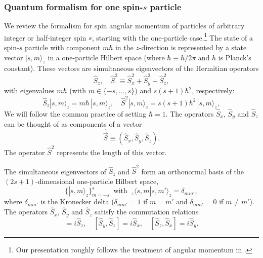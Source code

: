 

\subsubsection{Quantum formalism for one spin-$s$ particle} \label{2.1.1}

We review the formalism for spin angular momentum of particles of arbitrary integer or half-integer spin $s$, starting with the one-particle case.\footnote{Our presentation roughly follows the treatment of angular momentum in \citet[Vol.\ 2, Appendix C]{Messiah 1962}.} The state of a spin-$s$ particle with component $m\hbar$ in the $z$-direction is represented by a state vector $|s,m\rangle_z$ in a one-particle Hilbert space (where $\hbar \equiv h/2\pi$ and $h$ is Planck's constant). These vectors are simultaneous eigenvectors of the Hermitian operators 
\begin{equation}
\hat{S}_z, \quad \hat{S}^2\equiv \hat{S}_x^2+\hat{S}_y^2+\hat{S}_z^2,
\label{Sz and S^2}
\end{equation}
with eigenvalues $m \hbar$ (with $m \in \{ -s, \ldots, s\}$) and $s(s+1) \hbar^2$, respectively:
\begin{equation} 
\hat{S}_z |s,m\rangle_z =  m  \hbar \, |s,m\rangle_z,\quad \hat{S}^2 |s,m\rangle_z= s(s+1)   \hbar^2 \, |s,m\rangle_z,
\label{state dfn}
\end{equation} 
We will follow the common practice of setting $\hbar =1$. The operators $\hat{S}_x$, $\hat{S}_y$ and $\hat{S}_z$ can be thought of as components of a vector
\begin{equation}
\hat{\vec{S}} \equiv \left(\hat{S}_x, \hat{S}_y, \hat{S}_z \right).
\label{def S vector}
\end{equation}
The operator $\hat{S}^2$ represents the length of this vector. 

The simultaneous eigenvectors of $\hat{S}_z$ and $ \hat{S}^2$ form an orthonormal basis of the $(2s+1)$-dimensional one-particle Hilbert space,
\begin{equation}
\big\{|s,m \rangle_{z}\big\}_{m=-s}^s \;\; \mathrm{with} \;\; {_{z\!}}\langle s,  m | s,  m' \rangle_z = \delta_{mm'},
\label{onb one-particle Hilbert space}
\end{equation}
where $\delta_{mm'}$ is the Kronecker delta ($\delta_{mm'} = 1$ if $m=m'$ and $\delta_{mm'} = 0$ if $m \neq m'$). The operators $\hat{S}_x$, $\hat{S}_y$ and $\hat{S}_z$ satisfy the commutation relations 
\begin{equation}
[\hat{S}_x,\hat{S}_y]=i \hat{S}_z,\quad [\hat{S}_y,\hat{S}_z]=i \hat{S}_x,\quad [\hat{S}_z,\hat{S}_x]=i \hat{S}_y.
\label{ops dfn}
\end{equation}

